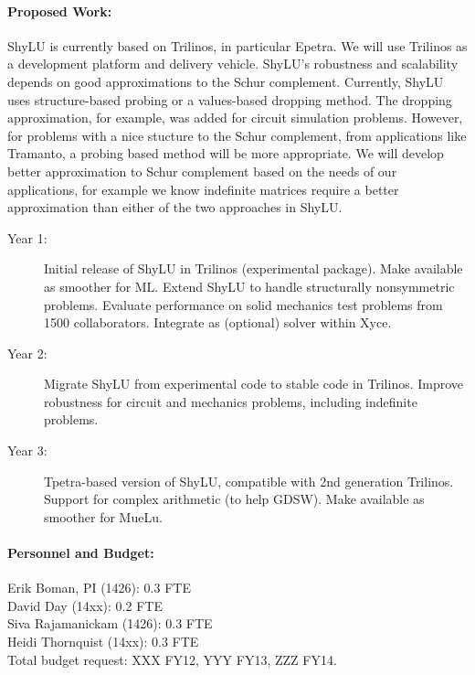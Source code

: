 \documentclass[10pt]{amsart}
\begin{document}
\paragraph{\bf Proposed Work:}
ShyLU is currently based on Trilinos, in particular Epetra.
We will use Trilinos as a development platform and delivery vehicle.
ShyLU's robustness and scalability depends on good
approximations to the Schur complement. Currently, ShyLU uses 
structure-based probing
or a values-based dropping method. The dropping approximation, for
example, was added for circuit simulation problems. However, for problems
with a nice stucture to the Schur complement, from applications like Tramanto,
a probing based method will be more appropriate. We will develop better
approximation to Schur complement based on the needs of our applications, for
example we know indefinite matrices require a better approximation than either
of the two approaches in ShyLU.  

\begin{description}
\item[Year 1:] 
Initial release of ShyLU in Trilinos (experimental package). 
Make available as smoother for ML.
Extend ShyLU to handle structurally nonsymmetric problems.
Evaluate performance on solid mechanics test problems from 
1500 collaborators.
Integrate as (optional) solver within Xyce. 
\item[Year 2:] 
Migrate ShyLU from experimental code to stable code in Trilinos.
Improve robustness for circuit and mechanics problems, including 
indefinite problems.
\item[Year 3:] 
Tpetra-based version of ShyLU, compatible with 2nd generation Trilinos.
Support for complex arithmetic (to help GDSW).
Make available as smoother for MueLu.
\end{description}


\paragraph{\bf Personnel and Budget:}
Erik Boman, PI (1426): 0.3 FTE\\
David Day (14xx): 0.2 FTE\\
Siva Rajamanickam (1426): 0.3 FTE\\
Heidi Thornquist (14xx): 0.3 FTE\\

Total budget request: XXX FY12, YYY FY13, ZZZ FY14.
\end{document}
